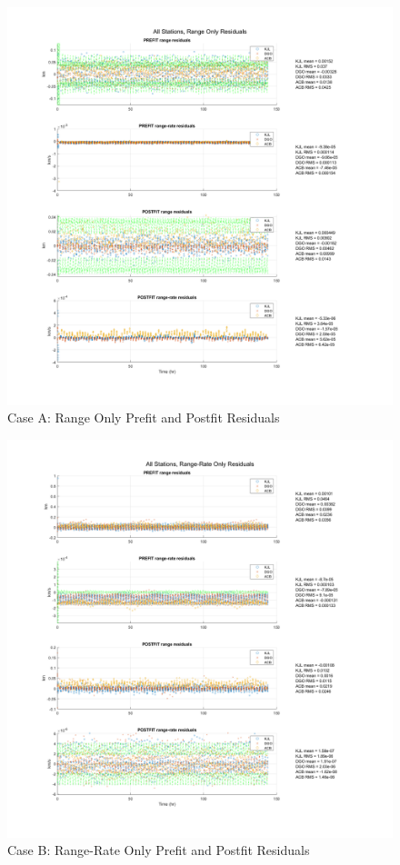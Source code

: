 \documentclass[conf]{new-aiaa}
\begin{document}
\begin{figure}[H]
	\centering
	\includegraphics[width=\textwidth]{caseA_res.png}
	\caption{Case A: Range Only Prefit and Postfit Residuals}
\end{figure}

\begin{figure}[H]
\centering
\includegraphics[width=\textwidth]{caseB_res.png}
\caption{Case B: Range-Rate Only Prefit and Postfit Residuals}
\end{figure}
\end{document}
